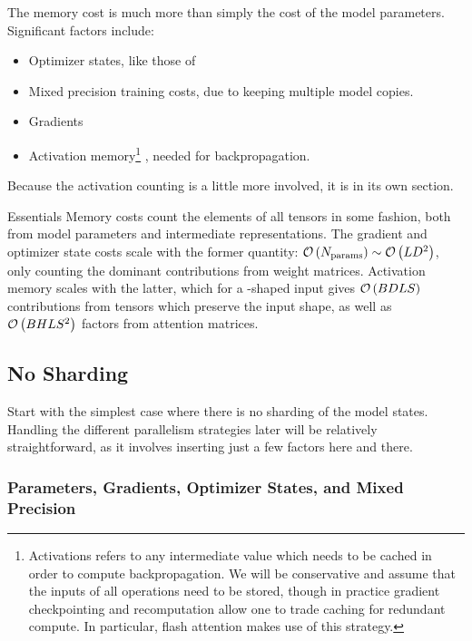 \documentclass[11pt]{article}
\begin{document}
The memory cost is much more than simply the cost of the model
parameters. Significant factors include:
\begin{itemize}
	\item Optimizer states, like those of 
	\item Mixed precision training costs, due to keeping multiple model copies.
	\item Gradients
	\item Activation memory\footnote{Activations refers to any intermediate value which needs to be
		      cached in order to compute backpropagation. We will be conservative and assume that the inputs
		      of all operations need to be stored, though in practice gradient checkpointing and recomputation
		      allow one to trade caching for redundant compute. In particular, flash attention
		      \cite{dao2022flashattention} makes use of this strategy.} , needed for backpropagation.
\end{itemize}
Because the activation counting is a little more involved, it is in its own section.


\begin{nicebox}{Essentials}
	Memory costs count the elements of all tensors in some fashion, both from model parameters and
	intermediate representations. The gradient and optimizer state costs scale with the former quantity:
	$ \mathcal{O} \left ( N _{ {\rm params}  } \right ) \sim \mathcal{O} \left ( L D ^{ 2 } \right )$, only counting
	the dominant contributions from weight matrices. Activation memory scales with the latter,
	which for a -shaped input gives $ \mathcal{O} \left ( BDLS  \right ) $ contributions
	from tensors which preserve the input shape, as well as $ \mathcal{O} \left( BHLS ^{ 2 } \right)  $
	factors from attention matrices.
\end{nicebox}


\subsection{No Sharding}

Start with the simplest case where there is no sharding of the model states. Handling the different
parallelism strategies later will be relatively straightforward, as it involves inserting just a few
factors here and there.

\subsubsection{Parameters, Gradients, Optimizer States, and Mixed Precision
	\label{sec_params_grads_optim_mem}}
\end{document}
